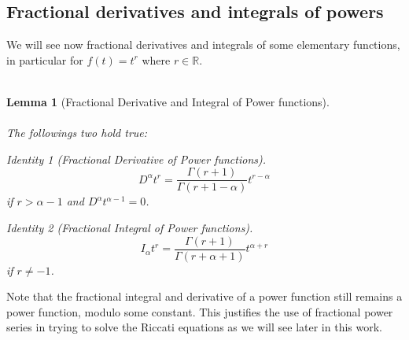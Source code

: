 \documentclass[a4paper,italian,11pt]{book}
\theoremstyle{plain}
\theoremstyle{remark}
\newtheorem{identity}{Identity}
\theoremstyle{plain}
\newtheorem{lemma}{Lemma}
\begin{document}
\subsection{Fractional derivatives and integrals of powers}

We will see now fractional derivatives and integrals of some elementary functions, in particular for $f(t) = t^r$ where $r\in \mathbb{R}$. 
\\\

\begin{lemma}[Fractional Derivative and Integral of Power functions]
\label{lemma: identities fract}
\\\
\\
The followings two hold true:
\begin{identity}[Fractional Derivative of Power functions]
\begin{equation}
    \label{eq: derivativePower}
    D^\alpha t^r = \frac{\Gamma(r+1)}{\Gamma(r+1-\alpha)} t^{r-\alpha} 
\end{equation}
if $r>\alpha - 1$ and $D^\alpha t^{\alpha-1} = 0$.
\end{identity}
\noindent
\begin{identity}[Fractional Integral of Power functions]
\begin{equation}
    \label{eq: integralPower}
    I_\alpha t^r = \frac{\Gamma(r+1)}{\Gamma(r+\alpha+1)} t^{\alpha+r} 
\end{equation}
if $r\ne -1$.
\end{identity}
\end{lemma}
Note that the fractional integral and derivative of a power function still remains a power function, modulo some constant. 
This justifies the use of fractional power series in trying to solve the Riccati equations as we will see later in this work.
\end{document}
